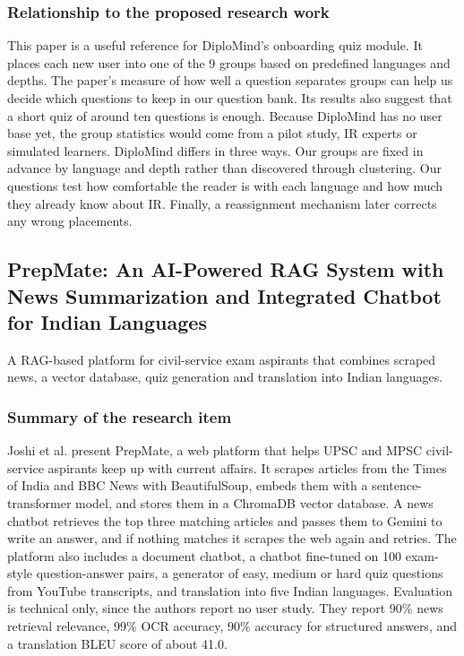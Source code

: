 \documentclass{FastFyp}
\begin{document}
\subsubsection{Relationship to the proposed research work}
This paper is a useful reference for DiploMind’s onboarding quiz module. It places each new user into one of the 9 groups based on predefined languages and depths. The paper’s measure of how well a question separates groups can help us decide which questions to keep in our question bank. Its results also suggest that a short quiz of around ten questions is enough. Because DiploMind has no user base yet, the group statistics would come from a pilot study, IR experts or simulated learners. DiploMind differs in three ways. Our groups are fixed in advance by language and depth rather than discovered through clustering. Our questions test how comfortable the reader is with each language and how much they already know about IR. Finally, a reassignment mechanism later corrects any wrong placements.


\subsection{PrepMate: An AI-Powered RAG System with News Summarization and Integrated Chatbot for Indian Languages}
A RAG-based platform for civil-service exam aspirants that combines scraped news, a vector database, quiz generation and translation into Indian languages.

\subsubsection{Summary of the research item}
Joshi et al. \cite{joshi2025prepmate} present PrepMate, a web platform that helps UPSC and MPSC civil-service aspirants keep up with current affairs. It scrapes articles from the Times of India and BBC News with BeautifulSoup, embeds them with a sentence-transformer model, and stores them in a ChromaDB vector database. A news chatbot retrieves the top three matching articles and passes them to Gemini to write an answer, and if nothing matches it scrapes the web again and retries. The platform also includes a document chatbot, a chatbot fine-tuned on 100 exam-style question-answer pairs, a generator of easy, medium or hard quiz questions from YouTube transcripts, and translation into five Indian languages. Evaluation is technical only, since the authors report no user study. They report 90\% news retrieval relevance, 99\% OCR accuracy, 90\% accuracy for structured answers, and a translation BLEU score of about 41.0.
\end{document}
